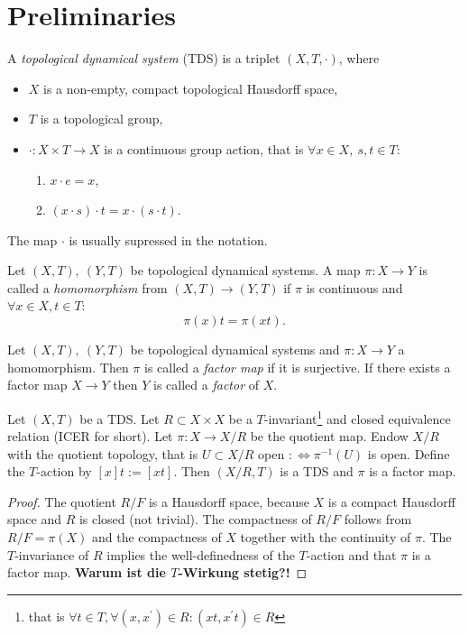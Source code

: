 \section{Preliminaries}
\begin{definition}
  A \emph{topological dynamical system} (TDS) is a triplet $(X,T,\cdot)$, where
  \begin{itemize}
    \item $X$ is a non-empty, compact topological Hausdorff space,
    \item $T$ is a topological group,
    \item $\cdot : X \times T \to X$ is a continuous group action, that is $\forall x \in X, \ s,t \in T$: 
    \begin{enumerate}
      \item $ x\cdot e = x$,
      \item $(x\cdot s)\cdot t = x \cdot (s \cdot t)$.
    \end{enumerate}
  \end{itemize}
\end{definition}
\begin{remark}
  The map $\cdot$ is usually supressed in the notation.
\end{remark}

\begin{definition}
  Let $(X,T), \ (Y,T)$ be topological dynamical systems.
  A map $\pi : X \to Y$ is called a \emph{homomorphism} from $(X,T) \to (Y,T)$ if $\pi$ is continuous and $\forall x \in X, t \in T$:
  \begin{equation*}
     \pi (x)   t = \pi ( x t).
  \end{equation*}
\end{definition}
\begin{definition}
   Let $(X,T), \ (Y,T)$ be topological dynamical systems and $\pi: X \to Y$ a homomorphism.
   Then $\pi$ is called a \emph{factor map} if it is surjective.
   If there exists a factor map $X \to Y$ then $Y$ is called a \emph{factor} of $X$.
\end{definition}

\begin{proposition}
  Let $(X,T)$ be a TDS. Let $R \subset X \times X$ be a $T$-invariant\footnote{that is $\forall t \in T, \forall (x,x^\prime ) \in R : (xt ,x^\prime t) \in R$} and closed equivalence relation (ICER for short).
  Let $\pi : X \to X/R$ be the quotient map.
  Endow $X/R$ with the quotient topology, that is $U \subset X/R$ open $: \Leftrightarrow \pi^{-1}(U)$ is open.
  Define the $T$-action by $[x] t := [x t]$.
  Then $(X/R, T)$ is a TDS and $\pi$ is a factor map.
\end{proposition}
\begin{proof}
  The quotient $R/F$ is a Hausdorff space, because $X$ is a compact Hausdorff space and $R$ is closed (not trivial).
 The compactness of $R/F$ follows from $R/F = \pi (X)$ and the compactness of $X$ together with the continuity of $\pi$. The $T$-invariance of $R$ implies the well-definedness of the $T$-action and that $\pi$ is a factor map.
  \textbf{Warum ist die $T$-Wirkung stetig?!}
\end{proof}

